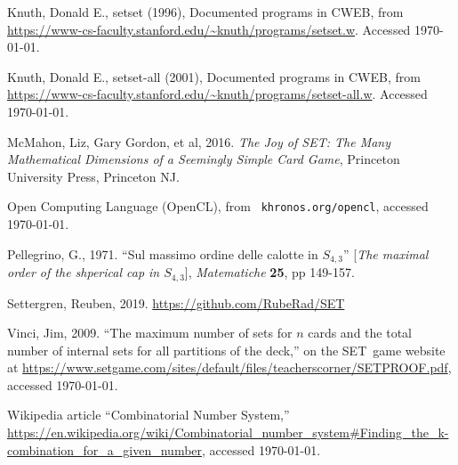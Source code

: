 \documentclass[10pt]{amsart}
\newcommand{\SETb}{SET\texttrademark\ } %
\begin{document}
\begin{thebibliography}{9} %


Knuth, Donald E., {\sc setset} (1996), Documented programs in
  CWEB, from
  \url{https://www-cs-faculty.stanford.edu/~knuth/programs/setset.w}. Accessed
  \today.

Knuth, Donald E., {\sc setset-all} (2001), Documented
  programs in CWEB, from
  \url{https://www-cs-faculty.stanford.edu/~knuth/programs/setset-all.w}. Accessed
  \today.

 McMahon, Liz, Gary Gordon, et al, 2016. {\em The Joy of SET: The
  Many Mathematical Dimensions of a Seemingly Simple Card Game}, Princeton
  University Press, Princeton NJ.

 Open Computing Language (OpenCL), from {\tt
  khronos.org/opencl}, accessed \today.

Pellegrino, G., 1971. ``Sul massimo ordine delle calotte in
  $S_{4,3}$'' [{\em The maximal order of the shperical cap in $S_{4,3}$}], {\em
  Matematiche} {\bf 25}, pp 149-157.

Settergren, Reuben, 2019. \url{https://github.com/RubeRad/SET}
  
Vinci, Jim, 2009. ``The maximum number of sets for $n$ cards and
  the total number of internal sets for all partitions of the deck,'' on the
  \SETb game website at
  \url{https://www.setgame.com/sites/default/files/teacherscorner/SETPROOF.pdf},
  accessed \today.

 Wikipedia article ``Combinatorial Number System,'' \url{https://en.wikipedia.org/wiki/Combinatorial_number_system#Finding_the_k-combination_for_a_given_number},
  accessed \today.

\end{thebibliography}
 
\end{document}
